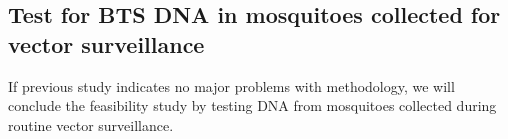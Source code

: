 \documentclass[12pt,letterpaper,english,bibliography=totocnumbered,abstract=on]{scrartcl}
\begin{document}
\subsection{Test for BTS DNA in mosquitoes collected for vector surveillance}

If previous study indicates no major problems with methodology, we will conclude the feasibility study by testing DNA from mosquitoes collected during routine vector surveillance. 


\printbibliography
\end{document}
